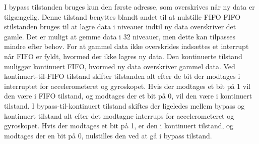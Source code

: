 I bypass tilstanden bruges kun den første adresse, som overskrives når ny data er tilgængelig. Denne tilstand benyttes blandt andet til at nulstille FIFO
FIFO stilstanden bruges til at lagre data i niveauer indtil ny data overskriver det gamle. Det er muligt at gemme data i 32 niveauer, men dette kan tilpasses mindre efter behov. For at gammel data ikke overskrides indsættes et interrupt når FIFO er fyldt, hvormed der ikke lagres ny data. 
Den kontinuerte tilstand muliggør kontinuert FIFO, hvormed ny data overskriver gammel data. 
Ved kontinuert-til-FIFO tilstand skifter tilstanden alt efter de bit der modtages i interruptet for accelerometeret og gyroskopet. Hvis der modtages et bit på 1 vil den være i FIFO tilstand, og modtages der et bit på 0, vil den være i kontinuert tilstand. 
I bypass-til-kontinuert tilstand skiftes der ligeledes mellem bypass og kontinuert tilstand alt efter det modtagne interrups for accelerometeret og gyroskopet. Hvis der modtages et bit på 1, er den i kontinuert tilstand, og modtages der en bit på 0, nulstilles den ved at gå i bypass tilstand. 
